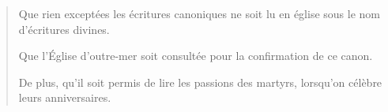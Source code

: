 \begin{quotation}
Que rien exceptées les écritures canoniques ne soit lu
en église sous le nom d’écritures divines.

Que l’Église d'outre-mer soit consultée pour la confirmation
de ce canon.

De plus, qu'il soit permis de lire les passions des martyrs,
lorsqu'on célèbre leurs anniversaires.
\end{quotation}

